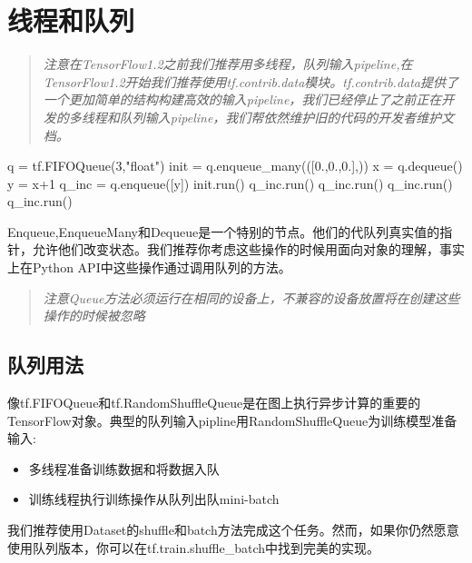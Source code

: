 \section{线程和队列}
\begin{quote}
	\emph{注意在TensorFlow1.2之前我们推荐用多线程，队列输入pipeline,在TensorFlow1.2开始我们推荐使用tf.contrib.data模块。tf.contrib.data提供了一个更加简单的结构构建高效的输入pipeline，我们已经停止了之前正在开发的多线程和队列输入pipeline，我们帮依然维护旧的代码的开发者维护文档。}
\end{quote}
\begin{python}
q = tf.FIFOQueue(3,"float")
init = q.enqueue_many(([0.,0.,0.],))
x = q.dequeue()
y = x+1
q_inc = q.enqueue([y])
init.run()
q_inc.run()
q_inc.run()
q_inc.run()
q_inc.run()
\end{python}
Enqueue,EnqueueMany和Dequeue是一个特别的节点。他们的代队列真实值的指针，允许他们改变状态。我们推荐你考虑这些操作的时候用面向对象的理解，事实上在Python API中这些操作通过调用队列的方法。
\begin{quote}
	\emph{注意Queue方法必须运行在相同的设备上，不兼容的设备放置将在创建这些操作的时候被忽略}
\end{quote}
\subsection{队列用法}
像tf.FIFOQueue和tf.RandomShuffleQueue是在图上执行异步计算的重要的TensorFlow对象。典型的队列输入pipline用RandomShuffleQueue为训练模型准备输入:
\begin{itemize}
	\item 多线程准备训练数据和将数据入队
	\item 训练线程执行训练操作从队列出队mini-batch
\end{itemize}
我们推荐使用Dataset的shuffle和batch方法完成这个任务。然而，如果你仍然愿意使用队列版本，你可以在tf.train.shuffle\_batch中找到完美的实现。

